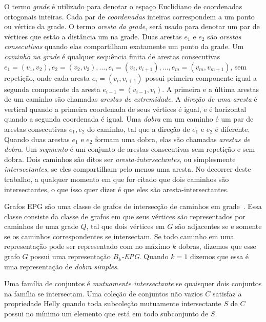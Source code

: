 O termo \emph{grade} é utilizado para denotar o espaço Euclidiano de coordenadas ortogonais inteiras. Cada par de \emph{coordenadas} inteiras correspondem a um ponto ou vértice da grade. O termo \emph{aresta da grade}, será usado para denotar um par de vértices que estão a distância um na grade. Duas arestas $e_1$ e $e_2$ são \emph{arestas consecutivas} quando elas compartilham exatamente um ponto da grade.
 Um \emph{caminho na grade} é qualquer sequência finita de arestas consecutivas $e_1 = (v_1, v_{2}), e_2 = (v_2, v_{3}), \dots, e_i = (v_i, v_{i+1}), \dots, e_m = (v_{m}, v_{m+1})$, sem repetição, onde cada aresta $e_i = (v_i, v_{i+1})$ possui primeira componente igual a segunda componente da aresta $e_{i-1} = (v_{i-1}, v_{i})$. A primeira e a última arestas de um caminho são chamadas \emph{arestas de extremidade}.
A \emph{direção de uma aresta} é vertical quando a primeira coordenada de seus vértices é igual, e é horizontal quando a segunda coordenada é igual. Uma \emph {dobra} em um caminho é um par de arestas consecutivas $ e_1, e_2 $ do caminho, tal que a direção de $ e_1$ e $ e_2$ é diferente. Quando duas arestas $ e_1$ e $e_2 $ formam uma dobra, elas são chamadas \emph {arestas de dobra}. Um \emph {segmento} é um conjunto de arestas consecutivas sem repetição e sem dobra. %
 Dois caminhos são ditos ser   \emph{aresta-intersectantes}, ou simplesmente  \emph{intersectantes}, se eles compartilham pelo menos uma aresta. %
 No decorrer deste trabalho, a qualquer momento em que for citado que dois caminhos são intersectantes, o que isso quer dizer é que eles são aresta-intersectantes. 
 
Grafos EPG são uma classe de grafos de intersecção de caminhos em grade~\cite{golumbic2009}. Essa classe consiste da classe de grafos em que seus vértices são representados por caminhos de uma grade $ Q $, tal que dois vértices em  $ G $ são adjacentes se e somente se os caminhos correspondentes se intersectam. Se todo caminho em uma representação pode ser representado com no máximo $ k $ dobras, dizemos que esse grafo $ G $ possui uma representação \emph{ $ B_k$-EPG}. Quando $ k = 1 $ dizemos que essa é uma representação de \emph{dobra simples}.

Uma família de conjuntos é  \emph{mutuamente intersectante} se quaisquer dois conjuntos na família se intersectam. Uma coleção de conjuntos não vazios $C$ satisfaz a propriedade Helly quando toda subcoleção mutuamente intersectante $S$ de $ C $ possui no mínimo um elemento que está em todo subconjunto de $S$.

